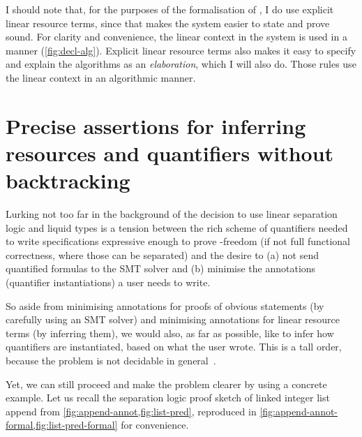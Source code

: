 I should note that, for the purposes of the formalisation of , I
do use explicit linear resource terms, since that makes the system easier to
state and prove sound. For clarity and convenience, the linear context in the
system is used in a  manner (\cref{fig:decl-alg}).
Explicit linear resource terms also makes it easy to specify and explain the
  algorithms as an \emph{elaboration}, which I
will also do. Those rules use the linear context in
an algorithmic manner.

\section{Precise assertions for inferring resources and quantifiers without
backtracking}\label{sec:precise-assertion-inferring}

Lurking not too far in the background of the decision to use linear separation
logic and liquid types is a tension between the rich scheme of quantifiers
needed to write specifications expressive enough to prove -freedom (if
not full functional correctness, where those can be separated) and the desire
to (a) not send quantified formulas to the SMT solver and (b) minimise the
annotations (quantifier instantiations) a user needs to write.

So aside from minimising annotations for proofs of obvious statements (by
carefully using an SMT solver) and minimising annotations for linear resource
terms (by inferring them), we would also, as far as possible, like to
infer how quantifiers are instantiated, based on what the user wrote. This is a tall order,
because the problem is not decidable in
general~.

Yet, we can still proceed and make the problem clearer by using a concrete
example. Let us recall the separation logic proof sketch of linked integer list
append from \cref{fig:append-annot,fig:list-pred}, reproduced in
\cref{fig:append-annot-formal,fig:list-pred-formal} for convenience.

